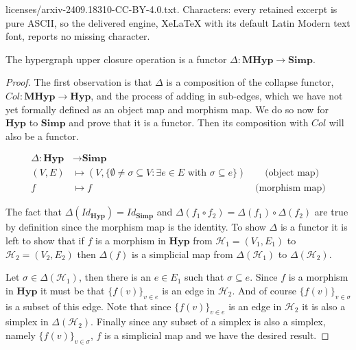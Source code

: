 \documentclass[10pt,a4paper]{amsart}
\newcommand{\Hyp}{\mathrm{\textbf{Hyp}}}
\newcommand{\MHyp}{\mathrm{\textbf{MHyp}}}
\newcommand{\Simp}{\mathrm{\textbf{Simp}}}
\renewcommand{\H}{\mathcal{H}}
\begin{document}
licenses/arxiv-2409.18310-CC-BY-4.0.txt. Characters: every retained excerpt is pure ASCII, so the delivered engine, XeLaTeX with its default Latin Modern text font, reports no missing character.
\begin{proposition}\label{prop:closure_functor}
The hypergraph upper closure operation is a functor $\Delta : \MHyp \rightarrow \Simp$.
\end{proposition}

\begin{proof}
The first observation is that $\Delta$ is a composition of the collapse functor, $Col:\MHyp\rightarrow\Hyp$, and the process of adding in sub-edges, which we have not yet formally defined as an object map and morphism map. We do so now for $\Hyp$ to $\Simp$ and prove that it is a functor. Then its composition with $Col$ will also be a functor.
\begin{samepage}
\begin{align*}
    \Delta : \Hyp& \rightarrow \Simp\\
        (V, E)& \mapsto (V, \{\emptyset \neq \sigma \subseteq V : \exists e \in E \text{ with }\sigma \subseteq e\}) \hspace{2em} \textrm{(object map)}\\
        f& \mapsto f \hspace{17em} \textrm{(morphism map)}
\end{align*}
\end{samepage}

The fact that $\Delta(Id_\Hyp) = Id_\Simp$ and $\Delta(f_1\circ f_2) = \Delta(f_1)\circ\Delta(f_2)$ are true by definition since the morphism map is the identity. To show $\Delta$ is a functor it is left to show that if $f$ is a morphism in $\Hyp$ from $\H_1=(V_1, E_1)$ to $\H_2=(V_2, E_2)$ then $\Delta(f)$ is a simplicial map from $\Delta(\H_1)$ to $\Delta(\H_2)$. 

Let $\sigma \in \Delta(\H_1)$, then there is an $e \in E_1$ such that $\sigma \subseteq e$. Since $f$ is a morphism in $\Hyp$ it must be that $\{f(v)\}_{v \in e}$ is an edge in $\H_2$. And of course $\{f(v)\}_{v \in \sigma}$ is a subset of this edge.
Note that since $\{f(v)\}_{v \in e}$ is an edge in $\H_2$ it is also a simplex in $\Delta(\H_2)$. Finally since any subset of a simplex is also a simplex, namely $\{f(v)\}_{v \in \sigma}$, $f$ is a simplicial map and we have the desired result. 



\end{proof}
\end{document}
